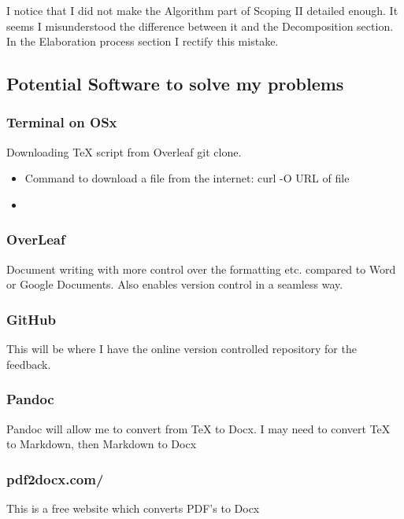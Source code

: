 \documentclass{article}
\begin{document}
\noindent
I notice that I did not make the Algorithm part of Scoping II detailed enough. It seems I misunderstood the difference between it and the Decomposition section. In the Elaboration process section I rectify this mistake.


\subsection{Potential Software to solve my problems}

\subsubsection{Terminal on OSx}

Downloading TeX script from Overleaf git clone.

\begin{itemize}
    \item Command to download a file from the internet: curl -O URL of file
    \item 
\end{itemize}

\subsubsection{OverLeaf}

Document writing with more control over the formatting etc. compared to Word or Google Documents. Also enables version control in a seamless way.

\subsubsection{GitHub}

This will be where I have the online version controlled repository for the feedback.

\subsubsection{Pandoc}

Pandoc will allow me to convert from TeX to Docx. I may need to convert TeX to Markdown, then Markdown to Docx

\subsubsection{pdf2docx.com/}

This is a free website which converts PDF's to Docx
\end{document}
